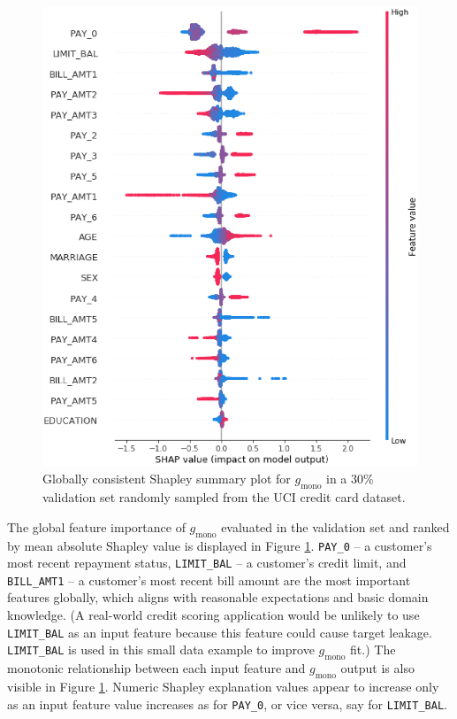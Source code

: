 \documentclass[sigconf, review]{acmart}
\begin{document}
\begin{figure}[htb]
	\begin{center}
		\includegraphics[scale=0.4]{img/figure_7.eps}
		\caption{Globally consistent Shapley summary plot for $g_{\text{mono}}$ in a 30\% validation set randomly sampled from the UCI credit card dataset.}
		\label{fig:cc_global_shapley}
	\end{center}
\end{figure}

The global feature importance of $g_{\text{mono}}$ evaluated in the validation set and ranked by mean absolute Shapley value is displayed in Figure \ref{fig:cc_global_shapley}. \texttt{PAY\_0} -- a customer's most recent repayment status, \texttt{LIMIT\_BAL} -- a customer's credit limit, and \texttt{BILL\_AMT1} -- a customer's most recent bill amount are the most important features globally, which aligns with reasonable expectations and basic domain knowledge. (A real-world credit scoring application would be unlikely to use \texttt{LIMIT\_BAL} as an input feature because this feature could cause target leakage. \texttt{LIMIT\_BAL} is used in this small data example to improve $g_{\text{mono}}$ fit.) The monotonic relationship between each input feature and $g_{\text{mono}}$ output is also visible in Figure \ref{fig:cc_global_shapley}. Numeric Shapley explanation values appear to increase only as an input feature value increases as for \texttt{PAY\_0}, or vice versa, say for \texttt{LIMIT\_BAL}. 
\end{document}
